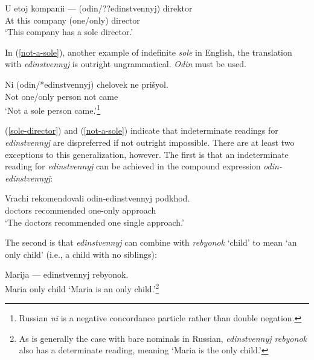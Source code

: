 \documentclass{article}
\begin{document}
\begin{exe}
	\ex \label{sole-director} \gll U etoj kompanii --- (odin/??edinstvennyj) direktor\\
	At this company {} (one/only) director\\
	\glt `This company has a sole director.'
\end{exe}


In (\ref{not-a-sole}), another example of indefinite \textit{sole} in English, the translation with \textit{edinstvennyj} is outright ungrammatical. \textit{Odin} must be used.

\begin{exe}
	\ex \label{not-a-sole} \gll Ni (odin/*edinstvennyj) chelovek ne pri\v{s}yol.\\
	Not one/only person not came\\
	\glt `Not a sole person came.'\footnote{Russian \textit{ni} is a negative concordance particle rather than double negation.}
\end{exe}

(\ref{sole-director}) and (\ref{not-a-sole}) indicate that indeterminate readings for \textit{edinstvennyj} are dispreferred if not outright impossible. There are at least two exceptions to this generalization, however. The first is that an indeterminate reading for \textit{edinstvennyj} can be achieved in the compound expression \textit{odin-edinstvennyj}:

\begin{exe}
	\ex \label{odin-edinstvennyj} \gll Vrachi rekomendovali odin-edinstvennyj podkhod.\\
	doctors recommended one-only approach\\
	`The doctors recommended one single approach.'
\end{exe}

The second is that \textit{edinstvennyj} can combine with \textit{rebyonok} `child' to mean `an only child' (i.e., a child with no siblings):

\begin{exe}
	\ex \label{only-child-ru} Marija --- edinstvennyj rebyonok.\\
	Maria {} only child
	\glt `Maria is an only child.'\footnote{As is generally the case with bare nominals in Russian, \textit{edinstvennyj rebyonok} also has a determinate reading, meaning `Maria is the only child.'}
\end{exe}
\end{document}
